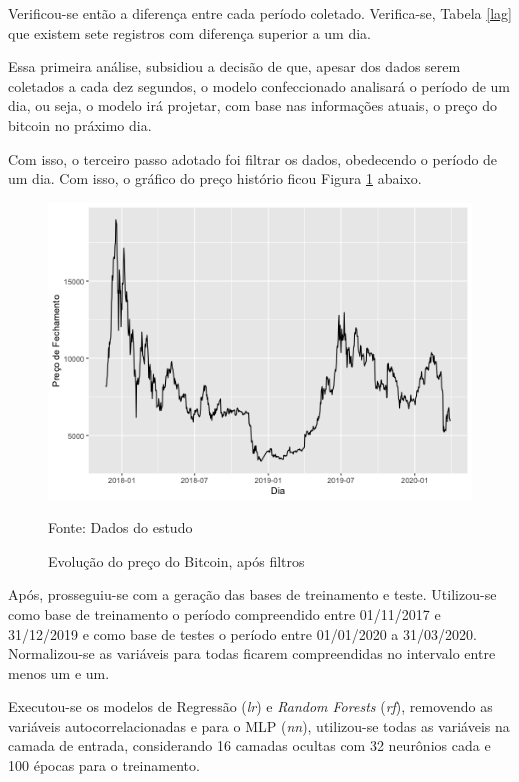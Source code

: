 \documentclass[12pt]{article}
\begin{document}
Verificou-se então a diferença entre cada período coletado. Verifica-se,
Tabela \ref{lag} que existem sete registros com diferença superior a um dia. 



Essa primeira análise, subsidiou a decisão de que, apesar dos dados serem 
coletados a cada dez segundos, o modelo confeccionado analisará o período de 
um dia, ou seja, o modelo irá projetar, com base nas informações atuais, 
o preço do bitcoin no práximo dia.

Com isso, o terceiro passo adotado foi filtrar os dados, obedecendo o período 
de um dia. Com isso, o gráfico do preço histório ficou Figura \ref{fig:dataset}
abaixo.

\begin{figure}[!ht]
  \centering
  \includegraphics[scale = 0.7]{img/dataset.png}
  \caption{Evolução do preço do Bitcoin, após filtros}
  Fonte: Dados do estudo
  \label{fig:dataset}
\end{figure}


Após, prosseguiu-se com a geração das bases de treinamento e teste. Utilizou-se 
como base de treinamento o período compreendido entre 01/11/2017 e 31/12/2019 e
como base de testes o período entre 01/01/2020 a 31/03/2020. Normalizou-se as 
variáveis para todas ficarem compreendidas no intervalo entre menos um e um. 

Executou-se os modelos de Regressão (\textit{lr}) e \textit{Random Forests} 
(\textit{rf}), removendo as variáveis autocorrelacionadas e para o MLP 
(\textit{nn}), utilizou-se todas as variáveis na camada de entrada, considerando 
16 camadas ocultas com 32 neurônios cada e 100 épocas para o treinamento.
\end{document}
